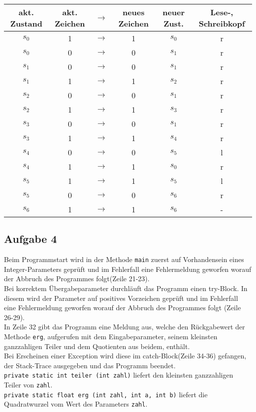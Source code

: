 \documentclass[a4paper,12pt]{article}
\begin{document}
\begin{center}
\begin{tabular}{|c|c|c|c|c|c|}\hline

akt. Zustand & akt. Zeichen & $ \longrightarrow $  & neues Zeichen 
& neuer Zust. & Lese-, Schreibkopf\\\hline\hline
  
$ s_{0}$ & 1 & $ \longrightarrow $ & 1 &$ s_{0} $& r \\\hline
$ s_{0}$ & 0 &$ \longrightarrow$ & 0 &$ s_{1}$ & r \\\hline
$ s_{1}$ & 0 &$ \longrightarrow$ & 0 &$ s_{1}$ & r \\\hline
$ s_{1}$ & 1 &$ \longrightarrow$ & 1 &$ s_{2}$ & r \\\hline
$ s_{2}$ & 0 &$ \longrightarrow$ & 0 &$ s_{1}$ & r \\\hline
$ s_{2}$ & 1 &$ \longrightarrow$ & 1 &$ s_{3}$ & r \\\hline
$ s_{3}$ & 0 &$ \longrightarrow$ & 0 &$ s_{1}$ & r \\\hline
$ s_{3}$ & 1 &$ \longrightarrow$ & 1 &$ s_{4}$ & r \\\hline
$ s_{4}$ & 0 &$ \longrightarrow$ & 0 &$ s_{5}$ & l \\\hline
$ s_{4}$ & 1 &$ \longrightarrow$ & 1 &$ s_{0}$ & r \\\hline
$ s_{5}$ & 1 &$ \longrightarrow$ & 1 &$ s_{5}$ & l \\\hline
$ s_{5}$ & 0 &$ \longrightarrow$ & 0 &$ s_{6}$ & r \\\hline
$ s_{6}$ & 1 &$ \longrightarrow$ & 1 &$ s_{6}$ & - \\\hline

\end{tabular}
\end{center}

\bigskip

\subsection*{Aufgabe 4}
Beim Programmstart wird in der Methode \lstinline!main! zuerst auf Vorhandensein
eines Integer-Parameters geprüft und im Fehlerfall eine Fehlermeldung geworfen
worauf der Abbruch des Programmes folgt(Zeile 21-23).\\
Bei korrektem Übergabeparameter durchläuft das Programm einen try-Block. In
diesem wird der Parameter auf positives Vorzeichen geprüft und im Fehlerfall
eine Fehlermeldung geworfen worauf der Abbruch des Programmes folgt
(Zeile 26-29).\\
In Zeile 32 gibt das Programm eine Meldung aus, welche den Rückgabewert der
Methode \lstinline!erg!, aufgerufen mit dem Eingabeparameter, seinem kleinsten
ganzzahligen Teiler und dem Quotienten aus beidem, enthält.\\
Bei Erscheinen einer Exception wird diese im catch-Block(Zeile 34-36) gefangen,
der Stack-Trace ausgegeben und das Programm beendet.\\
\lstinline!private static int teiler (int zahl)! liefert den kleinsten
ganzzahligen Teiler von \lstinline!zahl!.\\
\lstinline!private static float erg (int zahl, int a, int b)! liefert die
Quadratwurzel vom Wert des Parameters \lstinline!zahl!.
\end{document}
